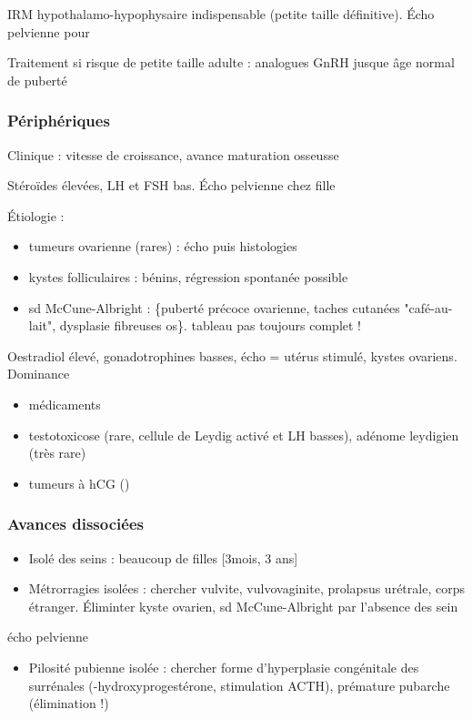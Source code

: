 \documentclass[11pt]{article}
\begin{document}
IRM hypothalamo-hypophysaire indispensable \danger (petite taille
définitive). Écho pelvienne pour \female

Traitement si risque de petite taille adulte : analogues GnRH jusque âge normal
de puberté
\subsubsection{Périphériques}
\label{sec:org044eeee}
Clinique : \inc vitesse de croissance, avance maturation osseusse

Stéroïdes élevées, LH et FSH bas. Écho pelvienne chez fille

Étiologie :
\begin{itemize}
\item tumeurs ovarienne (rares) : écho puis histologies
\item kystes folliculaires : bénins, régression spontanée possible
\item sd McCune-Albright : \{puberté précoce ovarienne, taches cutanées
"café-au-lait", dysplasie fibreuses os\}. \danger tableau pas toujours complet
!\\
\end{itemize}
Oestradiol élevé, gonadotrophines basses, écho = utérus stimulé, kystes
ovariens. Dominance \female
\begin{itemize}
\item médicaments
\item testotoxicose (rare, cellule de Leydig activé et LH basses), adénome leydigien
(très rare)
\item tumeurs à hCG (\male)
\end{itemize}
\subsubsection{Avances dissociées}
\label{sec:org4d637af}
\begin{itemize}
\item Isolé des seins : beaucoup de filles [3mois, 3 ans]
\item Métrorragies isolées : chercher vulvite, vulvovaginite, prolapsus urétrale,
corps étranger. Éliminter kyste ovarien, sd McCune-Albright par l'absence des
sein
\end{itemize}
\thus écho pelvienne
\begin{itemize}
\item Pilosité pubienne isolée : chercher forme d'hyperplasie congénitale des
surrénales (-hydroxyprogestérone, stimulation ACTH), prémature pubarche
(élimination !)
\end{itemize}
\end{document}

